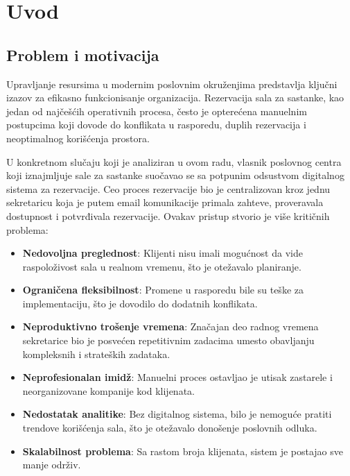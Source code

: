 \documentclass[12pt]{article}
\begin{document}
    \newpage
    \renewcommand{\contentsname}{Sadržaj}
    \tableofcontents{}

    \newpage
    \clearpage             %
    \setcounter{page}{1}   %

    \newpage
    \section{Uvod}
    \subsection{Problem i motivacija}

    Upravljanje resursima u modernim poslovnim okruženjima predstavlja ključni izazov za 
    efikasno funkcionisanje organizacija. Rezervacija sala za sastanke, kao jedan od najčešćih 
    operativnih procesa, često je opterećena manuelnim postupcima koji dovode do konflikata 
    u rasporedu, duplih rezervacija i neoptimalnog korišćenja prostora.

    U konkretnom slučaju koji je analiziran u ovom radu, vlasnik poslovnog centra koji 
    iznajmljuje sale za sastanke suočavao se sa potpunim odsustvom digitalnog sistema 
    za rezervacije. Ceo proces rezervacije bio je centralizovan kroz jednu sekretaricu koja 
    je putem email komunikacije primala zahteve, proveravala dostupnost i potvrđivala 
    rezervacije. Ovakav pristup stvorio je više kritičnih problema:

    \begin{itemize}
        \item \textbf{Nedovoljna preglednost}: Klijenti nisu imali mogućnost da vide raspoloživost sala u realnom vremenu, što je otežavalo planiranje.
        \item \textbf{Ograničena fleksibilnost}: Promene u rasporedu bile su teške za implementaciju, što je dovodilo do dodatnih konflikata.
        \item \textbf{Neproduktivno trošenje vremena}: Značajan deo radnog vremena sekretarice bio je posvećen repetitivnim zadacima umesto obavljanju kompleksnih i strateških zadataka.
        \item \textbf{Neprofesionalan imidž}: Manuelni proces ostavljao je utisak zastarele i neorganizovane kompanije kod klijenata.
        \item \textbf{Nedostatak analitike}: Bez digitalnog sistema, bilo je nemoguće pratiti trendove korišćenja sala, što je otežavalo donošenje poslovnih odluka.
        \item \textbf{Skalabilnost problema}: Sa rastom broja klijenata, sistem je postajao sve manje održiv.
    \end{itemize}
\end{document}
